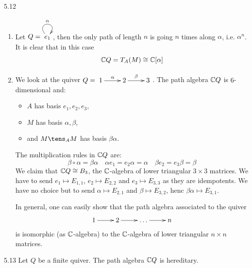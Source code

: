 \documentclass[twoside = false,	%
		headsepline,		%
		parskip = true,
		]{scrbook}						%
\begin{document}
    \begin{example}{}{5.12}
        \begin{enumerate}
            \item Let $Q = \xymatrix {e_1 \ar@(ul,ur)^{\alpha}}$, then the only path of length $n$ is going $n$ times along $\alpha$, i.e. $\alpha^n$. It is clear that in this case
            \begin{equation*}
                \mathbb C Q = T_A(M) \cong \mathbb C[\alpha]
            \end{equation*}
            \item We look at the quiver $Q = \xymatrix {1 \ar[r]^{\alpha} & 2 \ar[r]^{\beta} & 3}$.
            The path algebra $\mathbb C Q$ is $6$-dimensional and:
            \begin{itemize}
                \item $A$ has basis $e_1,e_2,e_3$,
                \item $M$ has basis $\alpha,\beta$,
                \item and $M \tens_A M$ has basis $\beta \alpha$.
            \end{itemize}
            The multiplication rules in $\mathbb C Q$ are:
            \begin{equation*}
                \beta \circ \alpha = \beta \alpha \quad \alpha e_1 = e_2 \alpha = \alpha \quad \beta e_2 = e_3 \beta = \beta
            \end{equation*}
            We claim that $\mathbb C Q \cong B_3$, the $\mathbb C$-algebra of lower triangular $3 \times 3$ matrices. We have to send $e_1 \mapsto E_{1,1}$, $e_2 \mapsto E_{2,2}$ and $e_3 \mapsto E_{3,3}$ as they are idempotents. We have no choice but to send $\alpha \mapsto E_{2,1}$ and $\beta \mapsto E_{3,2}$, henc $\beta \alpha \mapsto E_{3,1}$.

            In general, one can easily show that the path algebra associated to the quiver
            \begin{equation*}
                \xymatrix {
                    1 \ar[r] & 2 \ar[r] & \dots \ar[r] & n
                }
            \end{equation*}
            is isomorphic (as $\mathbb C$-algebra) to the $\mathbb C$-algebra of lower triangular $n \times n$ matrices.
        \end{enumerate}
    \end{example}

    \begin{corollary}{}{5.13}
        Let $Q$ be a finite quiver. The path algebra $\mathbb C Q$ is hereditary.
    \end{corollary}
\end{document}
